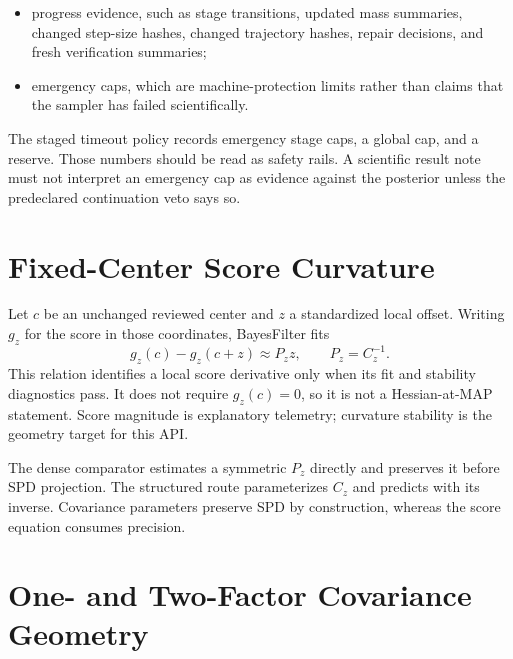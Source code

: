 \begin{itemize}
  \item progress evidence, such as stage transitions, updated mass summaries,
    changed step-size hashes, changed trajectory hashes, repair decisions, and
    fresh verification summaries;
  \item emergency caps, which are machine-protection limits rather than claims
    that the sampler has failed scientifically.
\end{itemize}

The staged timeout policy records emergency stage caps, a global cap, and a
reserve.  Those numbers should be read as safety rails.  A scientific result
note must not interpret an emergency cap as evidence against the posterior
unless the predeclared continuation veto says so.

\section{Fixed-Center Score Curvature}
\label{sec:bf-fixed-center-score-curvature}

Let $c$ be an unchanged reviewed center and $z$ a standardized local offset.
Writing $g_z$ for the score in those coordinates, BayesFilter fits
\begin{equation}
  g_z(c)-g_z(c+z) \approx P_z z,
  \qquad P_z=C_z^{-1}.
  \label{eq:bf-fixed-center-score-curvature}
\end{equation}
This relation identifies a local score derivative only when its fit and
stability diagnostics pass.  It does not require $g_z(c)=0$, so it is not a
Hessian-at-MAP statement.  Score magnitude is explanatory telemetry;
curvature stability is the geometry target for this API.

The dense comparator estimates a symmetric $P_z$ directly and preserves it
before SPD projection.  The structured route parameterizes $C_z$ and predicts
with its inverse.  Covariance parameters preserve SPD by construction, whereas
the score equation consumes precision.

\section{One- and Two-Factor Covariance Geometry}
\label{sec:bf-factor-correlation-geometry}

